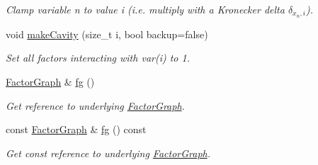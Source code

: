 \begin{CompactItemize}
\begin{CompactList}\small\item\em Clamp variable n to value i (i.e. multiply with a Kronecker delta $\delta_{x_n, i}$). \item\end{CompactList}\item 
\hypertarget{classdai_1_1DAIAlg_7f0b8452352080a1e35ab9a68cb589fd}{
void \hyperlink{classdai_1_1DAIAlg_7f0b8452352080a1e35ab9a68cb589fd}{makeCavity} (size\_\-t i, bool backup=false)}
\label{classdai_1_1DAIAlg_7f0b8452352080a1e35ab9a68cb589fd}

\begin{CompactList}\small\item\em Set all factors interacting with var(i) to 1. \item\end{CompactList}\item 
\hypertarget{classdai_1_1DAIAlg_9348542c22d04ed804388f1fe3009fa3}{
\hyperlink{classdai_1_1FactorGraph}{FactorGraph} \& \hyperlink{classdai_1_1DAIAlg_9348542c22d04ed804388f1fe3009fa3}{fg} ()}
\label{classdai_1_1DAIAlg_9348542c22d04ed804388f1fe3009fa3}

\begin{CompactList}\small\item\em Get reference to underlying \hyperlink{classdai_1_1FactorGraph}{FactorGraph}. \item\end{CompactList}\item 
\hypertarget{classdai_1_1DAIAlg_35400e471b8c3c98bef6c74ceac8fa16}{
const \hyperlink{classdai_1_1FactorGraph}{FactorGraph} \& \hyperlink{classdai_1_1DAIAlg_35400e471b8c3c98bef6c74ceac8fa16}{fg} () const }
\label{classdai_1_1DAIAlg_35400e471b8c3c98bef6c74ceac8fa16}

\begin{CompactList}\small\item\em Get const reference to underlying \hyperlink{classdai_1_1FactorGraph}{FactorGraph}. \item\end{CompactList}\end{CompactItemize}
